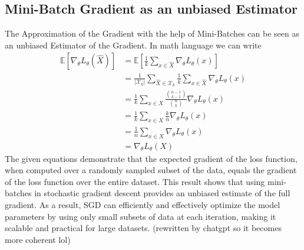 \documentclass[a4paper]{article}
\begin{document}
\subsection{Mini-Batch Gradient as an unbiased Estimator}
The Approximation of the Gradient with the help of Mini-Batches can be seen as an unbiased Estimator of the Gradient. In math language we can write 
\begin{align*}
    \mathbb{E} \left[ \nabla_{\theta} L_{\theta} (\hat{X}) \right] 
    &= \mathbb{E} \left[ \frac{1}{k} \sum_{x \in \hat{X}} \nabla_{\theta} L_{\theta} (x) \right] \\
    &= \frac{1}{|\mathcal{X}_k|} \sum_{\hat{X} \in \mathcal{X}_k} \frac{1}{k} \sum_{x \in \hat{X}} \nabla_{\theta} L_{\theta} (x) \\
    &= \frac{1}{k} \sum_{x \in X} \frac{\binom{n-1}{k-1}}{\binom{n}{k}} \nabla_{\theta} L_{\theta} (x) \\
    &= \frac{1}{k} \sum_{x \in X} \frac{k}{n} \nabla_{\theta} L_{\theta} (x) \\
    &= \frac{1}{n} \sum_{x \in X} \nabla_{\theta} L_{\theta} (x) \\
    &= \nabla_{\theta} L_{\theta} (X)
    \end{align*}
    The given equations demonstrate that the expected gradient of the loss function, when computed over a randomly sampled subset of the data, equals the gradient of the loss function over the entire dataset. This result shows that using mini-batches in stochastic gradient descent  provides an unbiased estimate of the full gradient. As a result, SGD can efficiently and effectively optimize the model parameters by using only small subsets of data at each iteration, making it scalable and practical for large datasets.
    (rewritten by chatgpt so it becomes more coherent lol)
\end{document}
